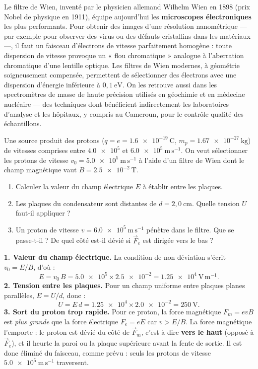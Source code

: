 \documentclass[11pt]{article}
\newcounter{popsec}
\newcounter{popsub}
\newcommand{\courssub}[1]{%
  \stepcounter{popsub}%
  \par\vspace{9pt}\noindent{\popxbold\fontsize{11.5}{13}\selectfont\color{popink}{\color{poporange}\thepopsec.\thepopsub}\hspace{6pt}#1}\par\nopagebreak\vspace{4pt}
}
\begin{document}
\begin{savaistu}
Le filtre de Wien, inventé par le physicien allemand Wilhelm Wien en 1898 (prix Nobel de physique en 1911), équipe aujourd'hui les \textbf{microscopes électroniques} les plus performants. Pour obtenir des images d'une résolution nanométrique — par exemple pour observer des virus ou des défauts cristallins dans les matériaux —, il faut un faisceau d'électrons de vitesse parfaitement homogène : toute dispersion de vitesse provoque un « flou chromatique » analogue à l'aberration chromatique d'une lentille optique. Les filtres de Wien modernes, à géométrie soigneusement compensée, permettent de sélectionner des électrons avec une dispersion d'énergie inférieure à $0{,}1\ \mathrm{eV}$. On les retrouve aussi dans les spectromètres de masse de haute précision utilisés en géochimie et en médecine nucléaire — des techniques dont bénéficient indirectement les laboratoires d'analyse et les hôpitaux, y compris au Cameroun, pour le contrôle qualité des échantillons.
\end{savaistu}

\courssub{Exercice résolu}

\begin{exoresolu}
Une source produit des protons ($q = e = \num{1,6e-19}\ \mathrm{C}$, $m_p = \num{1,67e-27}\ \mathrm{kg}$) de vitesses comprises entre $\num{4,0e5}$ et $\num{6,0e5}\ \mathrm{m\,s^{-1}}$. On veut sélectionner les protons de vitesse $v_0 = \num{5,0e5}\ \mathrm{m\,s^{-1}}$ à l'aide d'un filtre de Wien dont le champ magnétique vaut $B = \num{2,5e-2}\ \mathrm{T}$.
\begin{enumerate}
\item Calculer la valeur du champ électrique $E$ à établir entre les plaques.
\item Les plaques du condensateur sont distantes de $d = 2{,}0\ \mathrm{cm}$. Quelle tension $U$ faut-il appliquer ?
\item Un proton de vitesse $v = \num{6,0e5}\ \mathrm{m\,s^{-1}}$ pénètre dans le filtre. Que se passe-t-il ? De quel côté est-il dévié si $\vec{F}_e$ est dirigée vers le bas ?
\end{enumerate}
\tcblower
\textbf{1. Valeur du champ électrique.} La condition de non-déviation s'écrit $v_0 = E/B$, d'où :
\[ E = v_0\,B = \num{5,0e5}\times\num{2,5e-2} = \num{1,25e4}\ \mathrm{V\,m^{-1}}. \]
\textbf{2. Tension entre les plaques.} Pour un champ uniforme entre plaques planes parallèles, $E = U/d$, donc :
\[ U = E\,d = \num{1,25e4}\times\num{2,0e-2} = 250\ \mathrm{V}. \]
\textbf{3. Sort du proton trop rapide.} Pour ce proton, la force magnétique $F_m = evB$ est \emph{plus grande} que la force électrique $F_e = eE$ car $v > E/B$. La force magnétique l'emporte : le proton est dévié du côté de $\vec{F}_m$, c'est-à-dire \textbf{vers le haut} (opposé à $\vec{F}_e$), et il heurte la paroi ou la plaque supérieure avant la fente de sortie. Il est donc éliminé du faisceau, comme prévu : seuls les protons de vitesse $\num{5,0e5}\ \mathrm{m\,s^{-1}}$ traversent.
\end{exoresolu}
\end{document}
